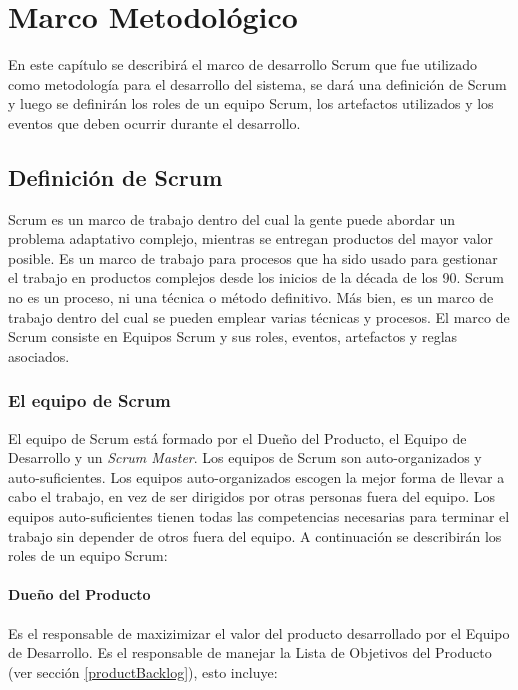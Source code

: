 \chapter{Marco Metodológico} \label{marcoMetodologico}

En este capítulo se describirá el marco de desarrollo Scrum que fue utilizado como metodología para el desarrollo del sistema, se dará una definición de Scrum y luego se definirán los roles de un equipo Scrum, los artefactos utilizados y los eventos que deben ocurrir durante el desarrollo.

\section{Definición de Scrum}
Scrum es un marco de trabajo dentro del cual la gente puede abordar un problema adaptativo complejo, mientras se entregan productos del mayor valor posible. Es un marco de trabajo para procesos que ha sido usado para gestionar el trabajo en productos complejos desde los inicios de la década de los 90. Scrum no es un proceso, ni una técnica o método definitivo. Más bien, es un marco de trabajo dentro del cual se pueden emplear varias técnicas y procesos. El marco de Scrum consiste en Equipos Scrum y sus roles, eventos, artefactos y reglas asociados. \cite{scrumSchwaber}

\subsection{El equipo de Scrum}
El equipo de Scrum está formado por el Dueño del Producto, el Equipo de Desarrollo y un \emph{Scrum Master}. Los equipos de Scrum son auto-organizados y auto-suficientes. Los equipos auto-organizados escogen la mejor forma de llevar a cabo el trabajo, en vez de ser dirigidos por otras personas fuera del equipo. Los equipos auto-suficientes tienen todas las competencias necesarias para terminar el trabajo sin depender de otros fuera del equipo. \cite{scrumSchwaber} A continuación se describirán los roles de un equipo Scrum:

\subsubsection{Dueño del Producto} \label{productOwner}
Es el responsable de maxizimizar el valor del producto desarrollado por el Equipo de Desarrollo. Es el responsable de manejar la Lista de Objetivos del Producto (ver sección \ref{productBacklog}), esto incluye:

